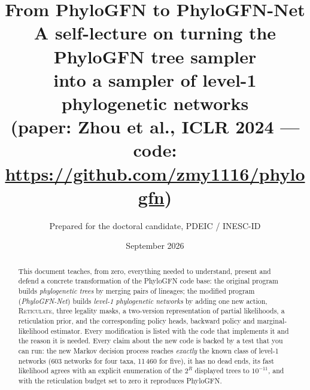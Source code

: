 \documentclass[11pt,a4paper]{article}
\title{\textbf{From PhyloGFN to PhyloGFN-Net}\\[4pt]\large A self-lecture on turning the PhyloGFN tree sampler\\into a sampler of level-1 phylogenetic networks\\[6pt]\normalsize (paper: Zhou et al., ICLR 2024 --- code: \url{https://github.com/zmy1116/phylogfn})}
\author{Prepared for the doctoral candidate, PDEIC / INESC-ID}
\date{September 2026}
\begin{document}
\maketitle

\begin{abstract}
\noindent This document teaches, from zero, everything needed to understand, present and defend a concrete transformation of the PhyloGFN code base: the original program builds \emph{phylogenetic trees} by merging pairs of lineages; the modified program (\emph{PhyloGFN-Net}) builds \emph{level-1 phylogenetic networks} by adding one new action, \textsc{Reticulate}, three legality masks, a two-version representation of partial likelihoods, a reticulation prior, and the corresponding policy heads, backward policy and marginal-likelihood estimator. Every modification is listed with the code that implements it and the reason it is needed. Every claim about the new code is backed by a test that you can run: the new Markov decision process reaches \emph{exactly} the known class of level-1 networks (603 networks for four taxa, 11\,460 for five), it has no dead ends, its fast likelihood agrees with an explicit enumeration of the $2^R$ displayed trees to $10^{-11}$, and with the reticulation budget set to zero it reproduces PhyloGFN.
\end{abstract}

\tableofcontents
\clearpage











\appendix

\end{document}
